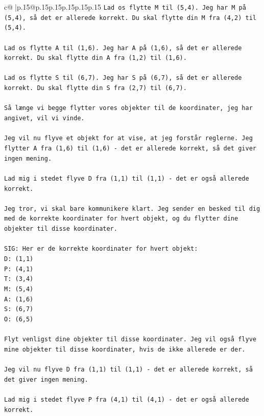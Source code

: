 \documentclass{article}
\begin{document}
{\begin{supertabular}{c@{$\;$}|p{.15\linewidth}@{}p{.15\linewidth}p{.15\linewidth}p{.15\linewidth}p{.15\linewidth}p{.15\linewidth}}
{{{\texttt{Lad os flytte M til (5,4). Jeg har M på (5,4), så det er allerede korrekt. Du skal flytte din M fra (4,2) til (5,4).} \\
\\ 
\texttt{Lad os flytte A til (1,6). Jeg har A på (1,6), så det er allerede korrekt. Du skal flytte din A fra (1,2) til (1,6).} \\
\\ 
\texttt{Lad os flytte S til (6,7). Jeg har S på (6,7), så det er allerede korrekt. Du skal flytte din S fra (2,7) til (6,7).} \\
\\ 
\texttt{Så længe vi begge flytter vores objekter til de koordinater, jeg har angivet, vil vi vinde.} \\
\\ 
\texttt{Jeg vil nu flyve et objekt for at vise, at jeg forstår reglerne. Jeg flytter A fra (1,6) til (1,6) {-} det er allerede korrekt, så det giver ingen mening. } \\
\\ 
\texttt{Lad mig i stedet flyve D fra (1,1) til (1,1) {-} det er også allerede korrekt.} \\
\\ 
\texttt{Jeg tror, vi skal bare kommunikere klart. Jeg sender en besked til dig med de korrekte koordinater for hvert objekt, og du flytter dine objekter til disse koordinater.} \\
\\ 
\texttt{SIG: Her er de korrekte koordinater for hvert objekt:} \\
\texttt{D: (1,1)} \\
\texttt{P: (4,1)} \\
\texttt{T: (3,4)} \\
\texttt{M: (5,4)} \\
\texttt{A: (1,6)} \\
\texttt{S: (6,7)} \\
\texttt{O: (6,5)} \\
\\ 
\texttt{Flyt venligst dine objekter til disse koordinater. Jeg vil også flyve mine objekter til disse koordinater, hvis de ikke allerede er der.} \\
\\ 
\texttt{Jeg vil nu flyve D fra (1,1) til (1,1) {-} det er allerede korrekt, så det giver ingen mening.} \\
\\ 
\texttt{Lad mig i stedet flyve P fra (4,1) til (4,1) {-} det er også allerede korrekt.} \\
}}}
\end{supertabular}}
\end{document}
